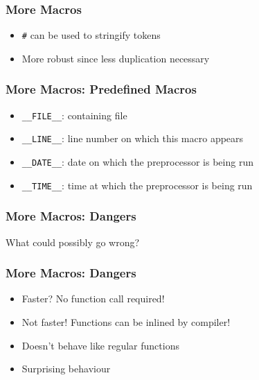 \documentclass{../ucll-slides}
\begin{document}
\begin{frame}
  \frametitle{More Macros}
  \begin{itemize}
    \item {\tt \#} can be used to stringify tokens
    \item More robust since less duplication necessary
  \end{itemize}
  \begin{overprint}
  \end{overprint}
\end{frame}

\begin{frame}
  \frametitle{More Macros: Predefined Macros}
  \begin{itemize}
    \item {\tt \_\_FILE\_\_}: containing file
    \item {\tt \_\_LINE\_\_}: line number on which this macro appears
    \item {\tt \_\_DATE\_\_}: date on which the preprocessor is being run
    \item {\tt \_\_TIME\_\_}: time at which the preprocessor is being run
  \end{itemize}
  \begin{overprint}
  \end{overprint}
\end{frame}

\begin{frame}
  \frametitle{More Macros: Dangers}
  \begin{center}
    What could possibly go wrong?
  \end{center}
  \vskip1cm
  \begin{overprint}
  \end{overprint}
\end{frame}

\begin{frame}
  \frametitle{More Macros: Dangers}
  \begin{itemize}
    \item Faster? No function call required!
    \item<2> Not faster! Functions can be inlined by compiler!
  \end{itemize}
  \vskip4mm
  \begin{itemize}
    \item Doesn't behave like regular functions
    \item Surprising behaviour
  \end{itemize}
\end{frame}
\end{document}
